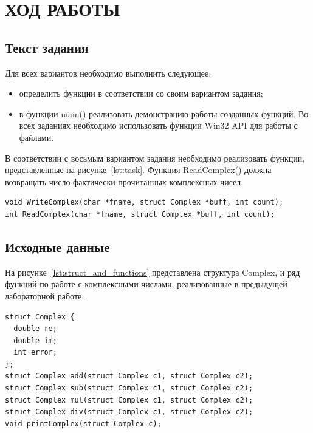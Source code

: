\section{ХОД РАБОТЫ}

\subsection{Текст задания}

Для всех вариантов необходимо выполнить следующее:

\begin{itemize}

  \item определить функции в соответствии со своим вариантом задания;
  \item в функции main() реализовать демонстрацию работы созданных функций. Во всех заданиях необходимо использовать функции Win32 API для работы с файлами.

\end{itemize}

В соответствии с восьмым вариантом задания необходимо реализовать функции, представленные на рисунке~\ref{lst:task}. Функция ReadComplex() должна возвращать число фактически прочитанных комплексных чисел.

\begin{lstlisting}[caption=Функции для чтения и записи в файл,label=lst:task]
void WriteComplex(char *fname, struct Complex *buff, int count);
int ReadComplex(char *fname, struct Complex *buff, int count);
\end{lstlisting}

\subsection{Исходные данные}

На рисунке~\ref{lst:struct_and_functions} представлена структура Complex, и ряд функций по работе с комплексными числами, реализованные в предыдущей лабораторной работе.

\begin{lstlisting}[caption=Структура Complex и объявление функций для работы с комплексными числами,label=lst:struct_and_functions]
struct Complex {
  double re;
  double im;
  int error;
};
struct Complex add(struct Complex c1, struct Complex c2);
struct Complex sub(struct Complex c1, struct Complex c2);
struct Complex mul(struct Complex c1, struct Complex c2);
struct Complex div(struct Complex c1, struct Complex c2);
void printComplex(struct Complex c);
\end{lstlisting}

